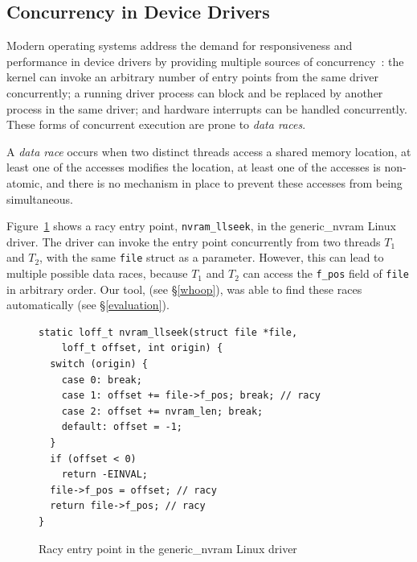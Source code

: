 \subsection{Concurrency in Device Drivers}
\label{bg:concurrency}

Modern operating systems address the demand for responsiveness and performance in device drivers by providing multiple sources of concurrency~\cite{corbet2005linux}: the kernel can invoke an arbitrary number of entry points from the same driver concurrently; a running driver process can block and be replaced by another process in the same driver; and hardware interrupts can be handled concurrently.  These forms of concurrent execution are prone to \emph{data races}.

\begin{definition}
\label{definition:datarace}
A \emph{data race} occurs when two distinct threads access a shared memory location, at least one of the accesses modifies the location, at least one of the accesses is non-atomic, and there is no mechanism in place to prevent these accesses from being simultaneous.
\end{definition}

Figure~\ref{fig:data_race_example} shows a racy entry point, \texttt{nvram\_llseek}, in the generic\_nvram Linux driver. The driver can invoke the entry point concurrently from two threads $T_1$ and $T_2$, with the same \texttt{file} struct as a parameter. However, this can lead to multiple possible data races, because $T_1$ and $T_2$ can access the \texttt{f\_pos} field of \texttt{file} in arbitrary order. Our tool, \whoop (see \S\ref{whoop}), was able to find these races automatically (see \S\ref{evaluation}).

\begin{figure}[t]
\begin{lstlisting}
static loff_t nvram_llseek(struct file *file,
    loff_t offset, int origin) {
  switch (origin) {
    case 0: break;
    case 1: offset += file->f_pos; break; // racy
    case 2: offset += nvram_len; break;
    default: offset = -1;
  }
  if (offset < 0)
    return -EINVAL;
  file->f_pos = offset; // racy
  return file->f_pos; // racy
}
\end{lstlisting}
\vspace{-2mm}
\caption{Racy entry point in the generic\_nvram Linux driver}
\label{fig:data_race_example}
\end{figure}

